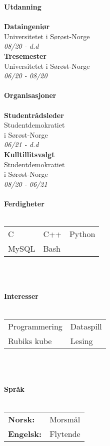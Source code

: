 \documentclass[a4paper, 12pt]{article}
\begin{document}
    \begin{minipage}[t]{0.3\textwidth}
        \Large\textbf{Utdanning}\\\\
        \normalsize\textbf{Dataingeniør}\\
        \small{Universitetet i Sørøst-Norge}\\
        \small \textit{08/20 - d.d} \\

        \normalsize\textbf{Tresemester}\\
        \small{Universitetet i Sørøst-Norge}\\
        \small \textit{06/20 - 08/20}\\\\
        \horizontalline{2cm}{0.4cm}
        \Large\textbf{Organisasjoner}\\\\
        \normalsize\textbf{Studentrådsleder}\\
        \small{Studentdemokratiet \\i Sørøst-Norge}\\
        \small{\textit{06/21 - d.d}}\\

        \normalsize\textbf{Kulltillitsvalgt}\\
        \small{Studentdemokratiet \\i Sørøst-Norge}\\
        \small{\textit{08/20 - 06/21}}\\\\
        \horizontalline{2cm}{0.4cm}
        \Large\textbf{Ferdigheter}\\\\
        \normalsize{
        \begin{tabular}{@{}l l l}
            C & C++ & Python \\
            MySQL & Bash & \\
        \end{tabular}\\\\
    }
        \horizontalline{2cm}{0.4cm}
        \Large\textbf{Interesser}\\\\
        \normalsize{
        \begin{tabular}{@{}l l}
            Programmering & Dataspill \\
            Rubiks kube & Lesing
        \end{tabular}\\\\
    }
        \horizontalline{2cm}{0.4cm}
        \Large\textbf{Språk}\\\\
        \normalsize{
        \begin{tabular}{@{}l l}
            \textbf{Norsk:} & Morsmål \\
            \textbf{Engelsk:} & Flytende \\
        \end{tabular}
    }
    \end{minipage}
\end{document}
